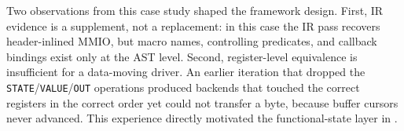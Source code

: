 Two observations from this case study shaped the framework design. First,
IR evidence is a supplement, not a replacement: in this case the IR pass
recovers header-inlined MMIO, but macro names, controlling predicates, and
callback bindings exist only at the AST level. Second, register-level
equivalence is insufficient for a data-moving driver. An earlier iteration
that dropped the \texttt{STATE}/\texttt{VALUE}/\texttt{OUT} operations
produced backends that touched the correct registers in the correct order
yet could not transfer a byte, because buffer cursors never advanced. This
experience directly motivated the functional-state layer in \rislang{}.
